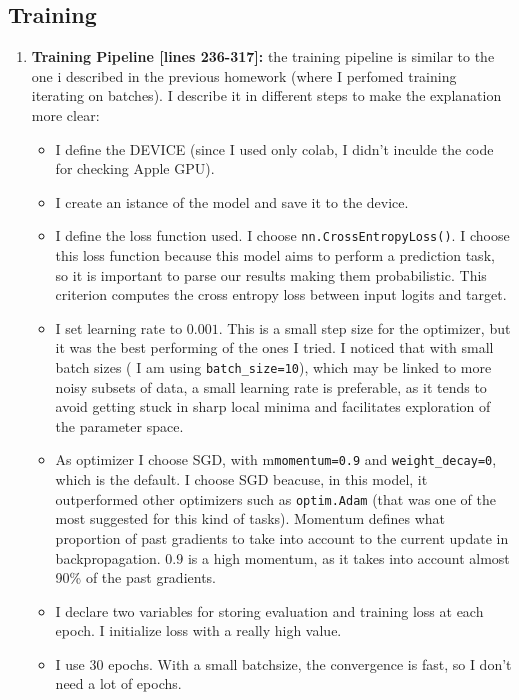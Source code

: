 \documentclass[a4paper]{article}
\begin{document}
\subsection{Training}
\begin{enumerate}
  	\item \textbf{Training Pipeline [lines 236-317]:} the training pipeline is similar to the one i described in the previous homework (where I perfomed training iterating on batches). I describe it in different steps to make the explanation more clear:
 \begin{itemize}
     \item I define the DEVICE (since I used only colab, I didn't inculde the code for checking Apple GPU). 
     \item I create an istance of the model and save it to the device.
     \item I define the loss function used. I choose \texttt{nn.CrossEntropyLoss()}. I choose this loss function because this model aims to perform a prediction task, so it is important to parse our results making them probabilistic. This criterion computes the cross entropy loss between input logits and target. 
     \item I set learning rate to $0.001$. This is a small step size for the optimizer, but it was the best performing of the ones I tried. I noticed that with small batch sizes ( I am using \texttt{batch\_size=10}), which may be linked to more noisy subsets of data, a small learning rate is preferable, as it tends to avoid getting stuck in sharp local minima and facilitates exploration of the parameter space.
     \item As optimizer I choose SGD, with m\texttt{momentum=0.9} and \texttt{weight\_decay=0}, which is the default. I choose SGD beacuse, in this model, it outperformed other optimizers such as \texttt{optim.Adam} (that was one of the most suggested for this kind of tasks). Momentum defines what proportion of past gradients to take into account to the current update in backpropagation. $0.9$ is a high momentum, as it takes into account almost 90\% of the past gradients.
     \item I declare two variables for storing evaluation and training loss at each epoch. I initialize loss with a really high value.
     \item I use $30$ epochs. With a small batchsize, the convergence is fast, so I don't need a lot of epochs. 

\end{itemize}
\end{enumerate}
\end{document}
